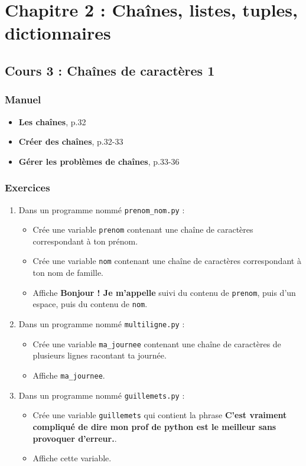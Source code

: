\documentclass[11pt]{article}
\begin{document}
\section*{Chapitre 2 : Chaînes, listes, tuples, dictionnaires}
\label{chapitre2}
\subsection*{Cours 3 : Chaînes de caractères 1}
\label{chapitre2_cours3}
\subsubsection*{Manuel}
\label{sec:orga512802}
\begin{itemize}
\item \textbf{\og Les chaînes\fg{}}, p.32
\item \textbf{\og Créer des chaînes\fg{}}, p.32-33
\item \textbf{\og Gérer les problèmes de chaînes\fg{}}, p.33-36
\end{itemize}
\subsubsection*{Exercices}
\label{sec:orga4cbf56}
\begin{enumerate}
\item Dans un programme nommé \texttt{prenom\_nom.py} :
\begin{itemize}
\item Crée une variable \texttt{prenom} contenant une chaîne de caractères correspondant à ton prénom.
\item Crée une variable \texttt{nom} contenant une chaîne de caractères correspondant à ton nom de famille.
\item Affiche \textbf{\og Bonjour ! Je m'appelle \fg{}} suivi du contenu de \texttt{prenom}, puis d'un espace, puis du contenu de \texttt{nom}.
\end{itemize}

\item Dans un programme nommé \texttt{multiligne.py} :
\begin{itemize}
\item Crée une variable \texttt{ma\_journee} contenant une chaîne de caractères de plusieurs lignes racontant ta journée.
\item Affiche \texttt{ma\_journee}.
\end{itemize}

\item Dans un programme nommé \texttt{guillemets.py} :
\begin{itemize}
\item Crée une variable \texttt{guillemets} qui contient la phrase \textbf{C'est vraiment compliqué de dire \og mon prof de python est le meilleur\fg{} sans provoquer d'erreur.}.
\item Affiche cette variable.
\end{itemize}
\end{enumerate}
\end{document}
